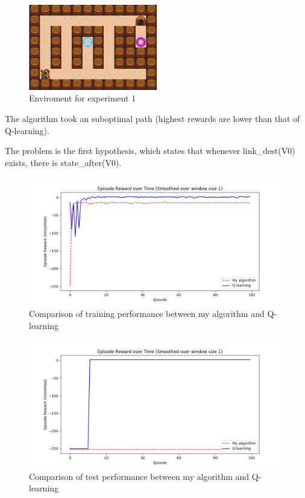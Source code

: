\begin{figure}[!htb]
\centering
\includegraphics[width=0.5\textwidth]{./figures/experiment3_v3}
\caption{Enviroment for experiment 1}
\label{experiment1}
\end{figure}

The algorithm took an suboptimal path (highest rewards are lower than that of Q-learning).

The problem is the first hypothesis, which states that whenever link\_dest(V0) exists, there is state\_after(V0).

\begin{figure}[!htb]
\centering
\includegraphics[width=1.0\textwidth]{./figures/experiment3_training_fail}
\caption{Comparison of training performance between my algorithm and Q-learning}
\label{experiment1_training}
\end{figure}

\begin{figure}[!htb]
\centering
\includegraphics[width=1.0\textwidth]{./figures/experiment3_test_fail}
\caption{Comparison of test performance between my algorithm and Q-learning}
\label{experiment1_test}
\end{figure}

